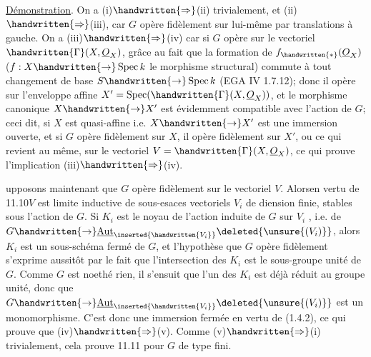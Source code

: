 \uline{Démonstration}. On a (i)$\handwritten{\Rightarrow}$(ii) trivialement, et (ii)$\handwritten{\Rightarrow}$(iii), car $G$ opère fidèlement sur lui-même par translations à gauche. On a (iii)$\handwritten{\Rightarrow}$(iv) car si $G$ opère  sur le vectoriel $\handwritten{\Gamma}(X,\underline{O}_X)$, grâce au fait que la formation de $f_{\handwritten{*}}(\underline{O}_X)$ ($f:X\handwritten{\to}\operatorname{Spec}k$ le morphisme structural) commute à tout changement de base $S\handwritten{\to}\operatorname{Spec}k$ (EGA IV 1.7.12); donc il opère sur l'enveloppe affine $X'=\operatorname{Spec}(\handwritten{\Gamma}(X,\underline{O}_X))$, et le morphisme canonique $X\handwritten{\to}X'$ est évidemment compatible avec l'action de $G$; ceci dit, si $X$ est quasi-affine i.e. $X\handwritten{\to}X'$ est une immersion ouverte, et si $G$ opère fidèlement sur $X$, il opère fidèlement sur $X'$, ou ce qui revient au même, sur le vectoriel $V=\handwritten{\Gamma}(X,\underline{O}_X)$, ce qui prouve l'implication (iii)$\handwritten{\Rightarrow}$(iv).

upposons maintenant  que $G$ opère fidèlement sur le vectoriel $V$. Alors\handwritten{,}en vertu de 11.10\handwritten{,}$V$ est limite inductive de sous-esaces vectoriels $V_i$ de diension finie, stables sous l'action de $G$. Si $K_i$ est le noyau de l'action induite de $G$ sur $V_i$ , i.e. de $G\handwritten{\to}\underline{\operatorname{Aut}}_{\inserted{\handwritten{V_i}}}\deleted{\unsure{(V_i)}}$, alors $K_i$ est un sous-schéma fermé de $G$, et l'hypothèse que $G$ opère fidèlement s'exprime aussitôt par le fait que  l'intersection des $K_i$ est le sous-groupe unité de $G$. Comme $G$ est noethé%
%
%
rien, il s'ensuit que l'un des $K_i$ est déjà réduit au groupe unité, donc que $G\handwritten{\to}\underline{\operatorname{Aut}}_{\inserted{\handwritten{V_i}}}\deleted{\unsure{(V_i)}}$ est un monomorphisme. C'est donc une immersion fermée en vertu de (1.4.2), ce qui prouve que (iv)$\handwritten{\Rightarrow}$(v). Comme (v)$\handwritten{\Rightarrow}$(i) trivialement, cela prouve 11.11 pour $G$ de type fini.

